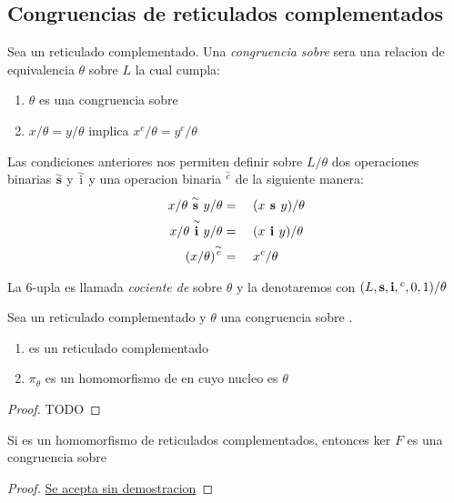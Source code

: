   \subsection{Congruencias de reticulados complementados}
  \begin{definition}
    Sea \reticulCompl un reticulado complementado. Una \emph{congruencia sobre} \reticulCompl sera una
    relacion de equivalencia $\theta$ sobre $L$ la cual cumpla: 
    \begin{enumerate}
      \item $\theta$ es una congruencia sobre \reticulAcot
      \item $x/\theta = y/\theta$ implica $x^c/\theta = y^c/\theta$
    \end{enumerate}

    Las condiciones anteriores nos permiten definir sobre $L/\theta$ dos operaciones binarias $\overset{\sim}{\textbf{s}}$ y $\overset{\sim}{\text{i}}$
    y una operacion binaria ${}^{\overset{\sim}{c}}$ de la siguiente manera:
    \begin{alignat*}{3}
      x/\theta\overset{\sim}{\textbf{ s }}y/\theta &=&\ & (x\textbf{ s }y)/\theta\\
      x/\theta\overset{\sim}{\textbf{ i }}y/\theta &=&\ & (x\textbf{ i }y)/\theta\\
      (x/\theta)^{\overset{\sim}{c}} &=&\ & x^c/\theta
    \end{alignat*}

    La 6-upla  es llamada
    \emph{cociente de} \reticulCompl sobre $\theta$ y la denotaremos con $(L, \textbf{s}, \textbf{i}, {}^c, 0, 1)/\theta$
  \end{definition}

  \begin{lemma}
    Sea \reticulCompl un reticulado complementado y $\theta$ una congruencia sobre \reticulCompl.
    \begin{enumerate}
      \item {} es un reticulado complementado
      \item $\pi_\theta$ es un homomorfismo de \reticulCompl en  cuyo nucleo es $\theta$
    \end{enumerate}
  \end{lemma}
  \begin{proof}
    TODO
  \end{proof}

  \begin{lemma}
    Si  es un homomorfismo de
    reticulados complementados, entonces ker $F$ es una congruencia sobre \reticulCompl
  \end{lemma}
  \begin{proof}
    \underline{Se acepta sin demostracion}
  \end{proof}
